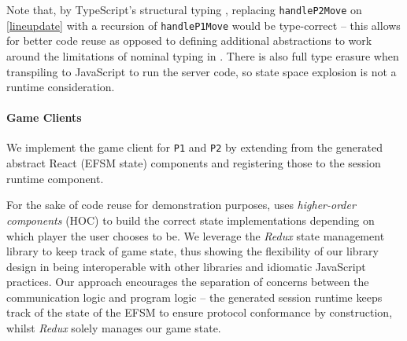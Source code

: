 Note that, by TypeScript's structural typing \cite{TypeScriptSpec}, replacing
\texttt{handleP2Move} on \cref{lineupdate} with a recursion of \texttt{handleP1Move} would be
type-correct -- this allows for better code reuse as opposed to defining
additional abstractions to work around the limitations of nominal typing in
\cite{Hybrid2016}.
There is also full type erasure when transpiling to JavaScript to run the
server code, so state space explosion is not a runtime consideration.

\paragraph{Game Clients}
We implement the game client for \texttt{P1} and
\texttt{P2} by extending from the generated abstract React (EFSM state)
components and registering those to the session runtime component.

For the sake of code reuse for demonstration purposes, \cite{NoughtsAndCrosses}
uses \textit{higher-order components} (HOC) to build the correct state
implementations depending on which player the user chooses to be.
We leverage the \textit{Redux} \cite{Redux} state management library to keep track of game
state, thus showing the flexibility of our library design in being
interoperable with other libraries and idiomatic JavaScript practices.
Our approach encourages the separation of concerns between the 
communication logic and program logic -- the generated session runtime
keeps track of the state of the EFSM to ensure protocol conformance by 
construction, whilst \textit{Redux} solely manages our game state.